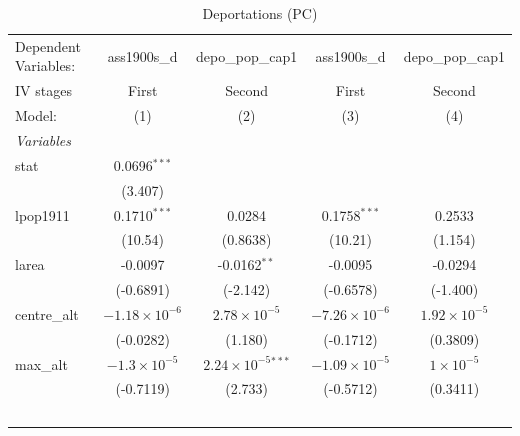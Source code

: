 
\begin{table}[htbp]
   \caption{Deportations (PC)}
   \centering
   \begin{tabular}{lcccc}
      \tabularnewline \midrule \midrule
      Dependent Variables:             & ass1900s\_d            & depo\_pop\_cap1               & ass1900s\_d            & depo\_pop\_cap1\\    
      IV stages                        & First                  & Second                        & First                  & Second \\   
      Model:                           & (1)                    & (2)                           & (3)                    & (4)\\  
      \midrule
      \emph{Variables}\\
      stat                             & 0.0696$^{***}$         &                               &                        &   \\   
                                       & (3.407)                &                               &                        &   \\   
      lpop1911                         & 0.1710$^{***}$         & 0.0284                        & 0.1758$^{***}$         & 0.2533\\   
                                       & (10.54)                & (0.8638)                      & (10.21)                & (1.154)\\   
      larea                            & -0.0097                & -0.0162$^{**}$                & -0.0095                & -0.0294\\   
                                       & (-0.6891)              & (-2.142)                      & (-0.6578)              & (-1.400)\\   
      centre\_alt                      & $-1.18\times 10^{-6}$  & $2.78\times 10^{-5}$          & $-7.26\times 10^{-6}$  & $1.92\times 10^{-5}$\\    
                                       & (-0.0282)              & (1.180)                       & (-0.1712)              & (0.3809)\\   
      max\_alt                         & $-1.3\times 10^{-5}$   & $2.24\times 10^{-5}$$^{***}$  & $-1.09\times 10^{-5}$  & $1\times 10^{-5}$\\    
                                       & (-0.7119)              & (2.733)                       & (-0.5712)              & (0.3411)\\   
$$
\end{tabular}
\end{table}
